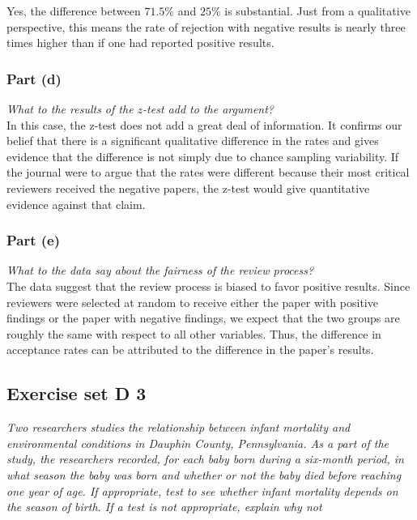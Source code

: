 \documentclass[11pt]{article}
\begin{document}
Yes, the difference between $71.5\%$ and $25\%$ is substantial.  Just from a qualitative perspective, this means the rate of rejection with negative results is nearly three times higher than if one had reported positive results.


\subsubsection*{Part (d)}
\textit{What to the results of the $z$-test add to the argument?}\\

In this case, the z-test does not add a great deal of information.  It confirms our belief that there is a significant qualitative difference in the rates and gives evidence that the difference is not simply due to chance sampling variability.  If the journal were to argue that the rates were different because their most critical reviewers received the negative papers, the z-test would give quantitative evidence against that claim.


\subsubsection*{Part (e)}
\textit{What to the data say about the fairness of the review process?}\\

The data suggest that the review process is biased to favor positive results.  Since reviewers were selected at random to receive either the paper with positive findings or the paper with negative findings, we expect that the two groups are roughly the same with respect to all other variables.  Thus, the difference in acceptance rates can be attributed to the difference in the paper's results.

\subsection*{Exercise set D 3} %
\textit{Two researchers studies the relationship between infant mortality and environmental conditions in Dauphin County, Pennsylvania. As a part of the study, the researchers recorded, for each baby born during a six-month period, in what season the baby was born and whether or not the baby died before reaching one year of age. If appropriate, test to see whether  infant mortality depends on the season of birth. If a test is not appropriate, explain why not}\\
\end{document}
